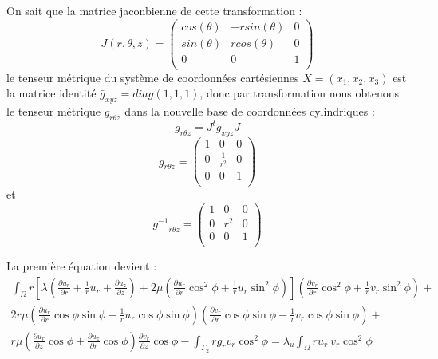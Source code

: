 \documentclass[a4paper,11pt]{article}   %
\begin{document}
On sait que la matrice jaconbienne de cette transformation :\\
$$J(r,\theta,z)=\begin{pmatrix}
   cos(\theta) & -rsin(\theta) & 0\\
   sin(\theta) & rcos(\theta) & 0 \\
   0           & 0           & 1  \\  
\end{pmatrix}$$
le tenseur métrique du système de coordonnées cartésiennes $X=(x_1,x_2,x_3)$ est la matrice identité $\bar{g}_{xyz}=diag(1,1,1)$, donc par transformation nous obtenons le tenseur métrique $g_{r\theta z}$ dans la nouvelle base de coordonnées cylindriques :\\
$$ g_{r\theta z} =   J^{t} \bar{g}_{xyz} J  $$
$$ g_{r\theta z} =  \begin{pmatrix}
                     1 &     0     & 0\\
                     0 & \frac{1}{r^{2}} & 0 \\
                     0           & 0           & 1  \\  
                    \end{pmatrix}   $$
et $$ {g^{-1}}_{r\theta z} =  \begin{pmatrix}
                     1 &     0     & 0\\
                     0 & r^{2} & 0 \\
                     0           & 0           & 1  \\  
                    \end{pmatrix}   $$


La première équation devient : \\
\begin{eqnarray*}
 \int_{\Omega} r \left[\lambda (\frac{\partial u_r}{\partial r} + \frac{1}{r} u_r + \frac{\partial u_z}{\partial z}) + 2 \mu (\frac{\partial u_r}{\partial r}\cos^2\phi + \frac{1}{r} u_r\sin^2\phi)\right] (\frac{\partial v_r}{\partial r}\cos^2\phi + \frac{1}{r} v_r\sin^2\phi) +  \\
  2 r  \mu \left(\frac{\partial u_r}{\partial r}\cos\phi\sin\phi - \frac{1}{r}u_r \cos\phi\sin\phi\right)\left(\frac{\partial v_r}{\partial r}\cos\phi\sin\phi - \frac{1}{r}v_r \cos\phi\sin\phi\right) +  \\
   r \mu \left(\frac{\partial u_r}{\partial z}\cos\phi + \frac{\partial u_z}{\partial r}\cos\phi\right)\frac{\partial v_r}{\partial z}\cos\phi - \int_{\Gamma_2} r g_r v_r {\cos}^2 \phi = \lambda _u \int_{\Omega} r u_r\ v_r \cos^2 \phi 
\end{eqnarray*} \\
\end{document}
